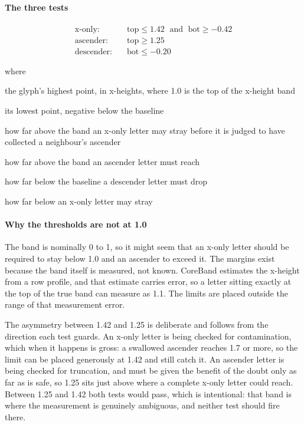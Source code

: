 \paragraph{The three tests}

\begin{equation}
\begin{aligned}\text{x-only:} \quad & \mathrm{top} \le 1.42 \;\text{ and }\; \mathrm{bot} \ge -0.42 \\[2pt]\text{ascender:} \quad & \mathrm{top} \ge 1.25 \\[2pt]\text{descender:} \quad & \mathrm{bot} \le -0.20\end{aligned}
\end{equation}

\noindent where
\begin{description}[leftmargin=2.4em,style=nextline,font=\normalfont\ttfamily]\setlength\itemsep{1pt}
  \item[{$\mathrm{top}$}] \normalfont the glyph's highest point, in x-heights, where 1.0 is the top of the x-height band
  \item[{$\mathrm{bot}$}] \normalfont its lowest point, negative below the baseline
  \item[{$1.42$}] \normalfont how far above the band an x-only letter may stray before it is judged to have collected a neighbour's ascender
  \item[{$1.25$}] \normalfont how far above the band an ascender letter must reach
  \item[{$-0.20$}] \normalfont how far below the baseline a descender letter must drop
  \item[{$-0.42$}] \normalfont how far below an x-only letter may stray
\end{description}

\paragraph{Why the thresholds are not at 1.0}
The band is nominally 0 to 1, so it might seem that an x-only letter should be required to stay below 1.0 and an ascender to exceed it. The margins exist because the band itself is measured, not known. CoreBand estimates the x-height from a row profile, and that estimate carries error, so a letter sitting exactly at the top of the true band can measure as 1.1. The limits are placed outside the range of that measurement error.

The asymmetry between 1.42 and 1.25 is deliberate and follows from the direction each test guards. An x-only letter is being checked for contamination, which when it happens is gross: a swallowed ascender reaches 1.7 or more, so the limit can be placed generously at 1.42 and still catch it. An ascender letter is being checked for truncation, and must be given the benefit of the doubt only as far as is safe, so 1.25 sits just above where a complete x-only letter could reach. Between 1.25 and 1.42 both tests would pass, which is intentional: that band is where the measurement is genuinely ambiguous, and neither test should fire there.


